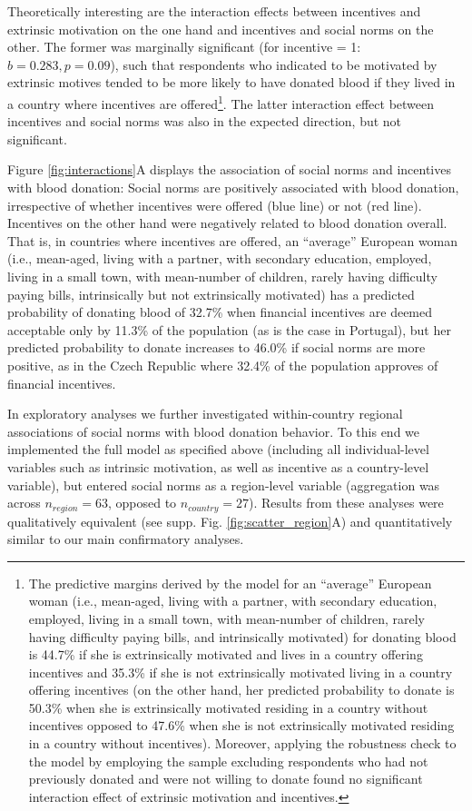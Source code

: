 \documentclass[AER]{AEA}
\begin{document}
Theoretically interesting are the interaction effects between incentives and extrinsic motivation on the one hand and incentives and social norms on the other. The former was marginally significant (for incentive = 1: $b = 0.283, p = 0.09$), such that respondents who indicated to be motivated by extrinsic motives tended to be more likely to have donated blood if they lived in a country where incentives are offered\footnote{The predictive margins derived by the model for an “average” European woman (i.e., mean-aged, living with a partner, with secondary education, employed, living in a small town, with mean-number of children, rarely having difficulty paying bills, and intrinsically motivated) for donating blood is 44.7\% if she is extrinsically motivated and lives in a country offering incentives and 35.3\% if she is not extrinsically motivated living in a country offering incentives (on the other hand, her predicted probability to donate is 50.3\% when she is extrinsically motivated residing in a country without incentives opposed to 47.6\% when she is not extrinsically motivated residing in a country without incentives). Moreover, applying the robustness check to the model by employing the sample excluding respondents who had not previously donated and were not willing to donate found no significant interaction effect of extrinsic motivation and incentives.}. The latter interaction effect between incentives and social norms was also in the expected direction, but not significant. 

Figure \ref{fig:interactions}A displays the association of social norms and incentives with blood donation: Social norms are positively associated with blood donation, irrespective of whether incentives were offered (blue line) or not (red line). Incentives on the other hand were negatively related to blood donation overall. That is, in countries where incentives are offered, an “average” European woman (i.e., mean-aged, living with a partner, with secondary education, employed, living in a small town, with mean-number of children, rarely having difficulty paying bills, intrinsically but not extrinsically motivated) has a predicted probability of donating blood of 32.7\% when financial incentives are deemed acceptable only by 11.3\% of the population (as is the case in Portugal), but her predicted probability to donate increases to 46.0\% if social norms are more positive, as in the Czech Republic where 32.4\% of the population approves of financial incentives.

In exploratory analyses we further investigated within-country regional associations of social norms with blood donation behavior. To this end we implemented the full model as specified above (including all individual-level variables such as intrinsic motivation, as well as incentive as a country-level variable), but entered social norms as a region-level variable (aggregation was across $n_{region} = 63$, opposed to $n_{country} = 27$). Results from these analyses were qualitatively equivalent (see supp. Fig. \ref{fig:scatter_region}A) and quantitatively similar to our main confirmatory analyses.
\end{document}
